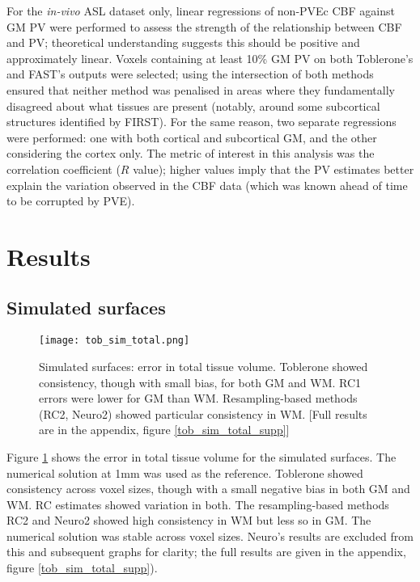 For the \textit{in-vivo} ASL dataset only, linear regressions of non-PVEc CBF against GM PV were performed to assess the strength of the relationship between CBF and PV; theoretical understanding suggests this should be positive and approximately linear. Voxels containing at least 10\% GM PV on both Toblerone's and FAST's outputs were selected; using the intersection of both methods ensured that neither method was penalised in areas where they fundamentally disagreed about what tissues are present (notably, around some subcortical structures identified by FIRST). For the same reason, two separate regressions were performed: one with both cortical and subcortical GM, and the other considering the cortex only. The metric of interest in this analysis was the correlation coefficient ($R$ value); higher values imply that the PV estimates better explain the variation observed in the CBF data (which was known ahead of time to be corrupted by PVE). 

\section{Results}

\subsection{Simulated surfaces}

\begin{figure}[H]
\centering
\texttt{[image: tob\_sim\_total.png]}
\caption{Simulated surfaces: error in total tissue volume. Toblerone showed consistency, though with small bias, for both GM and WM. RC1 errors were lower for GM than WM. Resampling-based methods (RC2, Neuro2) showed particular consistency in WM. [Full results are in the appendix, figure \ref{tob_sim_total_supp}]}
\label{tob_sim_total}
\end{figure}

Figure \ref{tob_sim_total} shows the error in total tissue volume for the simulated surfaces. The numerical solution at 1mm was used as the reference. Toblerone showed consistency across voxel sizes, though with a small negative bias in both GM and WM. RC estimates showed variation in both. The resampling-based methods RC2 and Neuro2 showed high consistency in WM but less so in GM. The numerical solution was stable across voxel sizes. Neuro’s results are excluded from this and subsequent graphs for clarity; the full results are given in the appendix, figure \ref{tob_sim_total_supp}). 

